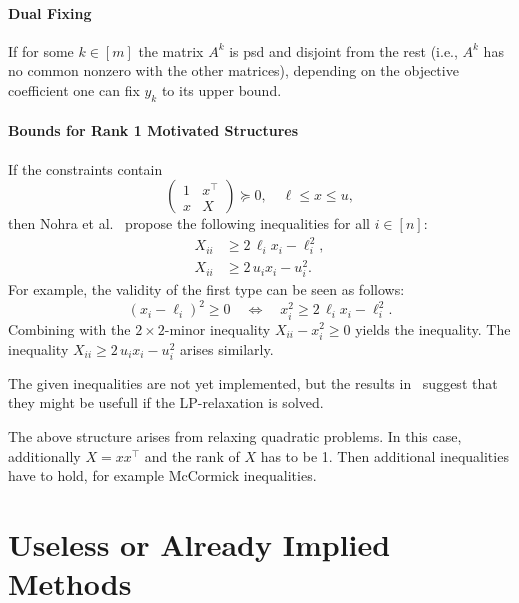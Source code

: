\documentclass[10pt, a4paper]{article}
\newcommand{\T}{^{\top}}
\begin{document}
\paragraph{Dual Fixing}

If for some $k \in [m]$ the matrix $A^k$ is psd and disjoint from the rest
(i.e., $A^k$ has no common nonzero with the other matrices), depending on
the objective coefficient one can fix $y_k$ to its upper bound.

\paragraph{Bounds for Rank 1 Motivated Structures}

If the constraints contain
\[
  \begin{pmatrix}
    1 & x\T \\
    x & X
  \end{pmatrix}
  \succeq 0,
  \quad
  \ell \leq x \leq u,
\]
then Nohra et al.~\cite{NohRS20} propose the following inequalities for all
$i \in [n]$:
\begin{align*}
  X_{ii} & \geq 2\, \ell_i x_i - \ell_i^2,\\ 
  X_{ii} & \geq 2\, u_i x_i - u_i^2.
\end{align*}
For example, the validity of the first type can be seen as follows:
\[
  (x_i - \ell_i)^2 \geq 0 \quad\Leftrightarrow\quad x_i^2 \geq 2\,
  \ell_i x_i - \ell_i^2.
\]
Combining with the $2 \times 2$-minor inequality $X_{ii} - x_i^2 \geq 0$
yields the inequality. The inequality $X_{ii} \geq 2\, u_i x_i - u_i^2$
arises similarly.

The given inequalities are not yet implemented, but the results
in~\cite{NohRS20} suggest that they might be usefull if the LP-relaxation
is solved.

The above structure arises from relaxing quadratic problems. In this case,
additionally $X = x x\T$ and the rank of $X$ has to be 1. Then additional
inequalities have to hold, for example McCormick inequalities.



\section{Useless or Already Implied Methods}


\end{document}
